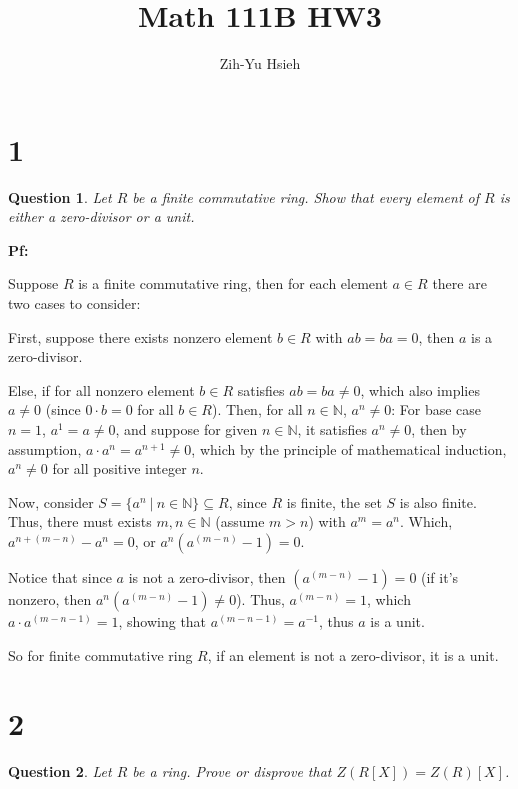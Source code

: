 \documentclass{article}
\title{Math 111B HW3}
\author{Zih-Yu Hsieh}
\newtheorem{question}{Question}
\begin{document}
\maketitle

\section*{1}
\begin{myBox}[]{}
    \begin{question}
        Let $R$ be a finite commutative ring. Show that every element of $R$ is either a
        zero-divisor or a unit.
    \end{question}
\end{myBox}

\textbf{Pf:}

Suppose $R$ is a finite commutative ring, then for each element $a\in R$ there are two cases to consider:

\hfill

First, suppose there exists nonzero element $b\in R$ with $ab=ba=0$, then $a$ is a zero-divisor.

\hfill

Else, if for all nonzero element $b\in R$ satisfies $ab=ba\neq 0$, which also implies $a\neq 0$ (since $0\cdot b=0$ for all $b\in R$).
Then, for all $n\in\mathbb{N}$, $a^n\neq 0$: For base case $n=1$, $a^1 = a\neq 0$, and suppose for given $n\in\mathbb{N}$, it satisfies
$a^n\neq 0$, then by assumption, $a\cdot a^n = a^{n+1}\neq 0$, which by the principle of mathematical induction, $a^n\neq 0$ for all 
positive integer $n$.

Now, consider $S=\{a^n\ |\ n\in\mathbb{N}\}\subseteq R$, since $R$ is finite, the set $S$ is also finite. Thus, there must exists $m,n\in\mathbb{N}$
(assume $m>n$) with $a^m=a^n$. Which, $a^{n+(m-n)}-a^n=0$, or $a^n(a^{(m-n)}-1)=0$.

Notice that since $a$ is not a zero-divisor, then $(a^{(m-n)}-1)=0$ (if it's nonzero, then $a^n(a^{(m-n)}-1)\neq 0$).
Thus, $a^{(m-n)}=1$, which $a\cdot a^{(m-n-1)}=1$, showing that $a^{(m-n-1)}=a^{-1}$, thus $a$ is a unit.

\hfill

So for finite commutative ring $R$, if an element is not a zero-divisor, it is a unit.

\break


\section*{2}
\begin{myBox}[]{}
    \begin{question}
        Let $R$ be a ring. Prove or disprove that $Z(R[X])=Z(R)[X]$.
    \end{question}
\end{myBox}
\end{document}
